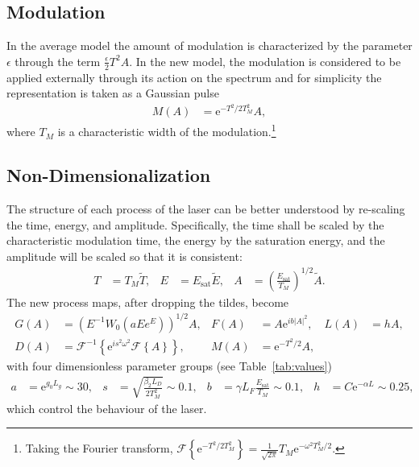 \documentclass[12pt]{article}
\newcommand{\Es}{E_{\textrm{sat}}}
\newcommand{\FT}[1]{\mathcal{F}\left\{ #1 \right\}}
\newcommand{\FTi}[1]{\mathcal{F}^{-1}\left\{ #1 \right\}}
\begin{document}
\subsection{Modulation}
In the average model the amount of modulation is characterized by the parameter $\epsilon$ through the term $\frac{\epsilon}{2}T^2 A$. In the new model, the modulation is considered to be applied externally through its action on the spectrum and for simplicity the representation is taken as a Gaussian pulse 
\begin{align}
	M(A) &= \textrm{e}^{-T^2 / 2 T_M^2} A,
\end{align}
where $T_M$ is a characteristic width of the modulation.\footnote{Taking the Fourier transform, $\FT{\textrm{e}^{-T^2/ 2 T_M^2}} = \frac{1}{\sqrt{2\pi}}T_M\textrm{e}^{-\omega^2T_M^2/2}$.}

\subsection{Non-Dimensionalization}
The structure of each process of the laser can be better understood by re-scaling the time, energy, and amplitude. Specifically, the time shall be scaled by the characteristic modulation time, the energy by the saturation energy, and the amplitude will be scaled so that it is consistent:
\begin{align*}
	T &= T_M \widetilde{T},& E &= \Es \widetilde{E},& A &= \left( \frac{\Es}{T_M} \right)^{1/2} \widetilde{A}.
\end{align*}
The new process maps, after dropping the tildes, become
\begin{align*}
	G(A) &= \left(E^{-1} W_0 \left( a E e^{E}\right) \right)^{1/2} A,&
	F(A) &= A \textrm{e}^{i b |A|^2},&
	L(A) &= h A,\\
	D(A) &= \FTi{\textrm{e}^{i s^2 \omega^2} \FT{A}},&
	M(A) &= \textrm{e}^{-T^2 / 2} A,
\end{align*}
with four dimensionless parameter groups (see Table~\ref{tab:values})
\begin{align*}
	a &= \textrm{e}^{g_0 L_g} \sim 30,& s &= \sqrt{\frac{\beta_2 L_D}{2 T_M^2}} \sim 0.1,&
	b &= \gamma L_F \frac{\Es}{T_M} \sim 0.1,& h &= C \textrm{e}^{-\alpha L} \sim 0.25,
\end{align*}
which control the behaviour of the laser.
\end{document}
